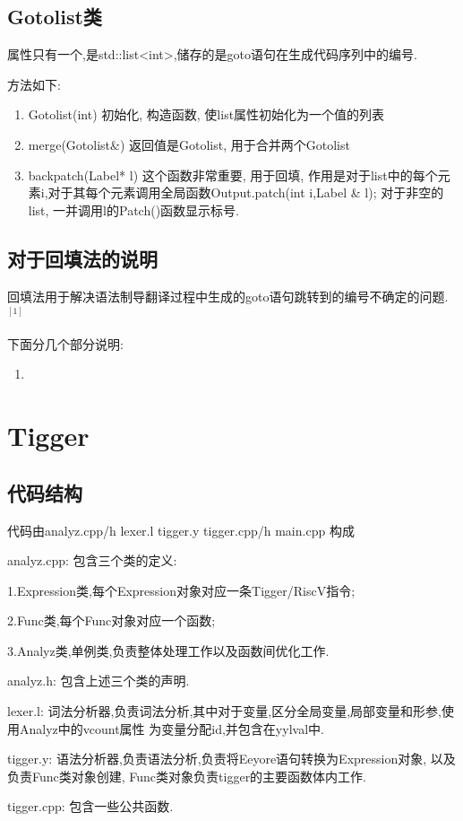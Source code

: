 \documentclass[UTF8]{article}
\begin{document}
\subsection{Gotolist类}
属性只有一个,是std::list<int>,储存的是goto语句在生成代码序列中的编号.

方法如下:
\begin{enumerate}
\item Gotolist(int) 初始化, 构造函数, 使list属性初始化为一个值的列表
\item merge(Gotolist\&) 返回值是Gotolist, 用于合并两个Gotolist
\item backpatch(Label* l) 这个函数非常重要, 用于回填, 作用是对于list中的每个元素i,对于其每个元素调用全局函数Output.patch(int i,Label \& l); 对于非空的list, 一并调用l的Patch()函数显示标号.
\end{enumerate}
\subsection{对于回填法的说明}
回填法用于解决语法制导翻译过程中生成的goto语句跳转到的编号不确定的问题.$^[1]$

下面分几个部分说明:
\begin{enumerate}
\item 
\end{enumerate}
\section{Tigger}
\subsection{代码结构}
代码由analyz.cpp/h lexer.l tigger.y tigger.cpp/h main.cpp 构成

analyz.cpp: 包含三个类的定义: 

	1.Expression类,每个Expression对象对应一条Tigger/RiscV指令;
	
	2.Func类,每个Func对象对应一个函数; 
	
	3.Analyz类,单例类,负责整体处理工作以及函数间优化工作. 

analyz.h: 包含上述三个类的声明.

lexer.l: 词法分析器,负责词法分析,其中对于变量,区分全局变量,局部变量和形参,使用Analyz中的vcount属性
为变量分配id,并包含在yylval中.

tigger.y: 语法分析器,负责语法分析,负责将Eeyore语句转换为Expression对象, 以及负责Func类对象创建, Func类对象负责tigger的主要函数体内工作.

tigger.cpp: 包含一些公共函数.
\end{document}
